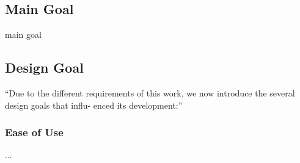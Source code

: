 \subsection{Main Goal} %
\label{sub:main_goal}

main goal


\subsection{Design Goal} %
\label{sub:design_goal}

``Due to the different requirements of this work, we now introduce the several design goals that influ- enced its development:''

\subsubsection{Ease of Use} %
\label{ssub:ease_of_use}

...





